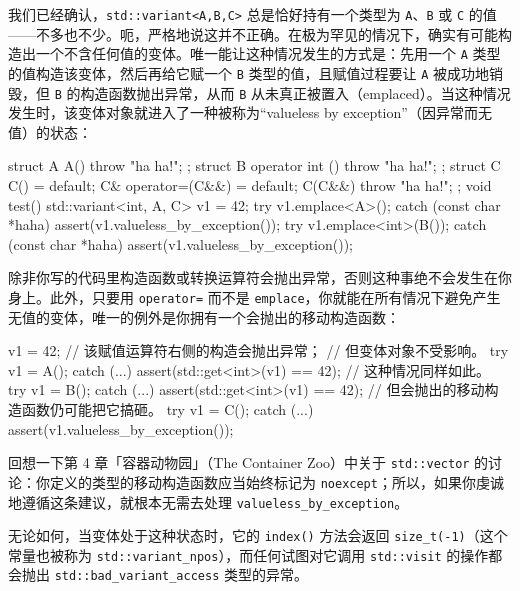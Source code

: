 我们已经确认，\texttt{std::\allowbreak{}variant<\allowbreak{}A,\allowbreak{}B,\allowbreak{}C>\allowbreak{}} 总是恰好持有一个类型为 \texttt{A}、\texttt{B} 或 \texttt{C} 的值——不多也不少。呃，严格地说这并不正确。在极为罕见的情况下，确实有可能构造出一个不含任何值的变体。唯一能让这种情况发生的方式是：先用一个 \texttt{A} 类型的值构造该变体，然后再给它赋一个 \texttt{B} 类型的值，且赋值过程要让 \texttt{A} 被成功地销毁，但 \texttt{B} 的构造函数抛出异常，从而 \texttt{B} 从未真正被置入（emplaced）。当这种情况发生时，该变体对象就进入了一种被称为“valueless by exception”（因异常而无值）的状态：

\begin{codebox}[cpp]
    struct A {
      A() { throw "ha ha!"; }
    };
    struct B {
      operator int () { throw "ha ha!"; }
    };
    struct C {
      C() = default;
      C& operator=(C&&) = default;
      C(C&&) { throw "ha ha!"; }
    };
    void test()
    {
      std::variant<int, A, C> v1 = 42;
      try {
        v1.emplace<A>();
      } catch (const char *haha) {}
      assert(v1.valueless_by_exception());
      try {
        v1.emplace<int>(B());
      } catch (const char *haha) {}
      assert(v1.valueless_by_exception());
    }
\end{codebox}

除非你写的代码里构造函数或转换运算符会抛出异常，否则这种事绝不会发生在你身上。此外，只要用 \texttt{operator=} 而不是 \texttt{emplace}，你就能在所有情况下避免产生无值的变体，唯一的例外是你拥有一个会抛出的移动构造函数：

\begin{codebox}[cpp]
    v1 = 42;
    // 该赋值运算符右侧的构造会抛出异常；
    // 但变体对象不受影响。
    try { v1 = A(); } catch (...) {}
    assert(std::get<int>(v1) == 42);
    // 这种情况同样如此。
    try { v1 = B(); } catch (...) {}
    assert(std::get<int>(v1) == 42);
    // 但会抛出的移动构造函数仍可能把它搞砸。
    try { v1 = C(); } catch (...) {}
    assert(v1.valueless_by_exception());
\end{codebox}

回想一下第 4 章「容器动物园」（The Container Zoo）中关于 \texttt{std::\allowbreak{}vector} 的讨论：你定义的类型的移动构造函数应当始终标记为 \texttt{noexcept}；所以，如果你虔诚地遵循这条建议，就根本无需去处理 \texttt{valueless\_\allowbreak{}by\_\allowbreak{}exception}。

无论如何，当变体处于这种状态时，它的 \texttt{index(\allowbreak{})\allowbreak{}} 方法会返回 \texttt{size\_\allowbreak{}t(\allowbreak{}-1)\allowbreak{}}（这个常量也被称为 \texttt{std::\allowbreak{}variant\_\allowbreak{}npos}），而任何试图对它调用 \texttt{std::\allowbreak{}visit} 的操作都会抛出 \texttt{std::\allowbreak{}bad\_\allowbreak{}variant\_\allowbreak{}access} 类型的异常。

